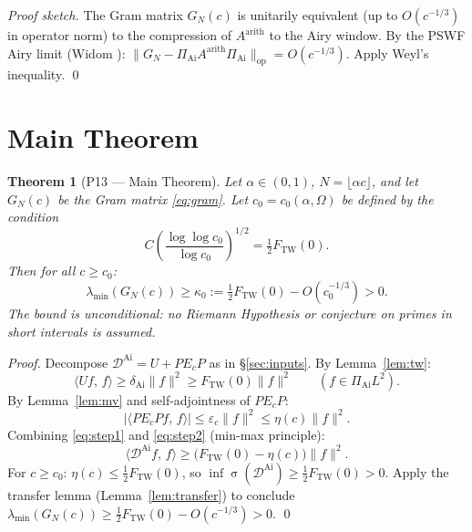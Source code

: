 \documentclass[12pt,a4paper]{amsart}
\newtheorem{theorem}{Theorem}
\theoremstyle{definition}
\newcommand{\DAi}{\mathcal{D}^{\mathrm{Ai}}}
\newcommand{\PAi}{\Pi_{\mathrm{Ai}}}
\newcommand{\GN}{G_N(c)}
\newcommand{\Ec}{E_c}
\newcommand{\norm}[1]{\|#1\|}
\newcommand{\ip}[2]{\langle #1,\, #2 \rangle}
\DeclareMathOperator{\spec}{\sigma}
\begin{document}
\begin{proof}[Proof sketch]
The Gram matrix $\GN$ is unitarily equivalent (up to $O(c^{-1/3})$ in
operator norm) to the compression of $A^{\mathrm{arith}}$ to the Airy window.
By the PSWF Airy limit (Widom \cite{Widom1964}):
$\norm{G_N - \PAi A^{\mathrm{arith}} \PAi}_{\mathrm{op}} = O(c^{-1/3})$.
Apply Weyl's inequality.
\qed
\end{proof}

\section{Main Theorem}\label{sec:main}

\begin{theorem}[P13 --- Main Theorem]\label{thm:P13}
Let $\alpha \in (0,1)$, $N = \lfloor \alpha c \rfloor$,
and let $\GN$ be the Gram matrix \eqref{eq:gram}.
Let $c_0 = c_0(\alpha, \Omega)$ be defined by the condition
\[
  C\left(\frac{\log\log c_0}{\log c_0}\right)^{1/2} = \tfrac12 F_{\mathrm{TW}}(0).
\]
Then for all $c \ge c_0$:
\begin{equation}\label{eq:P13}
  \lambda_{\min}(\GN)
  \ge \kappa_0 := \tfrac{1}{2} F_{\mathrm{TW}}(0) - O(c_0^{-1/3})
  > 0.
\end{equation}
The bound is unconditional: no Riemann Hypothesis or conjecture on
primes in short intervals is assumed.
\end{theorem}

\begin{proof}
Decompose $\DAi = U + P\Ec P$ as in \S\ref{sec:inputs}.
By Lemma~\ref{lem:tw}:
\begin{equation}\label{eq:step1}
  \ip{U f}{f} \ge \delta_{\mathrm{Ai}} \norm{f}^2
  \ge F_{\mathrm{TW}}(0)\norm{f}^2
  \qquad (f \in \PAi L^2).
\end{equation}
By Lemma~\ref{lem:mv} and self-adjointness of $P\Ec P$:
\begin{equation}\label{eq:step2}
  |\ip{P\Ec Pf}{f}| \le \varepsilon_c \norm{f}^2
  \le \eta(c)\norm{f}^2.
\end{equation}
Combining \eqref{eq:step1} and \eqref{eq:step2} (min-max principle):
\begin{equation}\label{eq:step3}
  \ip{\DAi f}{f}
  \ge \bigl(F_{\mathrm{TW}}(0) - \eta(c)\bigr)\norm{f}^2.
\end{equation}
For $c \ge c_0$: $\eta(c) \le \frac{1}{2}F_{\mathrm{TW}}(0)$, so
$\inf\spec(\DAi) \ge \frac{1}{2}F_{\mathrm{TW}}(0) > 0$.
Apply the transfer lemma (Lemma~\ref{lem:transfer}) to conclude
$\lambda_{\min}(\GN) \ge \frac{1}{2}F_{\mathrm{TW}}(0) - O(c^{-1/3}) > 0$. \qed
\end{proof}
\end{document}

